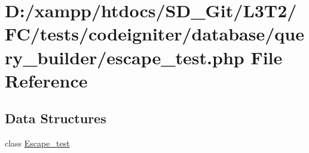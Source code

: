 \hypertarget{escape__test_8php}{}\section{D\+:/xampp/htdocs/\+S\+D\+\_\+\+Git/\+L3\+T2/\+F\+C/tests/codeigniter/database/query\+\_\+builder/escape\+\_\+test.php File Reference}
\label{escape__test_8php}
\subsection*{Data Structures}
\begin{DoxyCompactItemize}
\item 
class \hyperlink{class_escape__test}{Escape\+\_\+test}
\end{DoxyCompactItemize}
